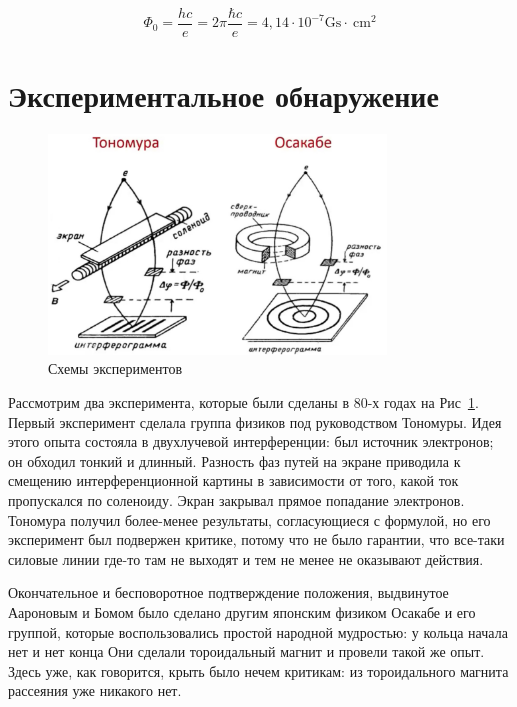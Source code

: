 \documentclass[a4paper, 14pt]{article}
\begin{document}
    \[ \Phi_0 = \frac{h c}{e} = 2 \pi \frac{\hbar c}{e} = 4,14 \cdot 10^{-7} \mathrm{Gs} \cdot \mathrm{~cm}^2 \]
    
    \section*{Экспериментальное обнаружение} 
    
    \begin{figure} [h]
        \centering
        \includegraphics[width=0.8\textwidth]{exp23}
        \caption{Схемы экспериментов}
        \label{fig:exp23}
    \end{figure}
    
    Рассмотрим два эксперимента, которые были сделаны в 80-х годах на Рис~\ref{fig:exp23}.
    Первый эксперимент сделала группа физиков под руководством Тономуры.
    Идея этого опыта состояла в двухлучевой интерференции: был источник электронов; он обходил тонкий и длинный.
    Разность фаз путей на экране приводила к смещению интерференционной картины в зависимости от того, какой ток
    пропускался по соленоиду.
    Экран закрывал прямое попадание электронов.
    Тономура получил более-менее результаты, согласующиеся с формулой, но его эксперимент был подвержен критике,
    потому что не было гарантии, что все-таки силовые линии где-то там не выходят и тем не менее не оказывают действия.
    
    Окончательное и бесповоротное подтверждение положения, выдвинутое Аароновым и Бомом было сделано другим японским
    физиком Осакабе и его группой, которые воспользовались простой народной мудростью: у кольца начала нет и нет конца
    Они сделали тороидальный магнит и провели такой же опыт.
    Здесь уже, как говорится, крыть было нечем критикам: из тороидального магнита рассеяния уже никакого нет.
    
\end{document}
